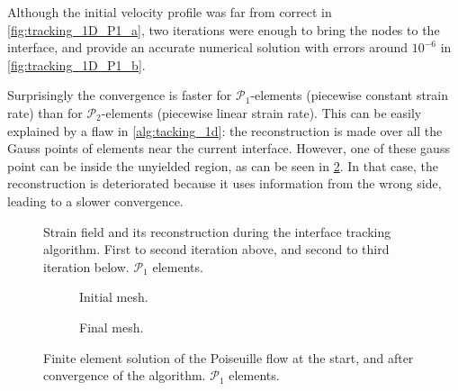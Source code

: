 \documentclass[11 pt]{report}
\begin{document}
\FloatBarrier
Although the initial velocity profile was far from correct in \cref{fig:tracking_1D_P1_a}, two iterations were enough to bring the nodes to the interface, and provide an accurate numerical solution with errors around $10^{-6}$ in \cref{fig:tracking_1D_P1_b}.

Surprisingly the convergence is faster for $\mathcal{P}_1$-elements (piecewise constant strain rate) than for $\mathcal{P}_2$-elements (piecewise linear strain rate). This can be easily explained by a flaw in \cref{alg:tacking_1d}: the reconstruction is made over all the Gauss points of elements near the current interface. However, one of these gauss point can be inside the unyielded region, as can be seen in \cref{fig:tracking_1D_P2_steps}. In that case, the reconstruction is deteriorated because it uses information from the wrong side, leading to a slower convergence.

\begin{figure}[hb]
    \centering
    \begin{subfigure}[t]{\textwidth}
        
        \label{subfig:tracking_1D_P2_step_1}
    \end{subfigure}
    \begin{subfigure}[t]{\textwidth}
        
    \end{subfigure}
    \caption{Strain field and its reconstruction during the interface tracking algorithm. First to second iteration above, and second to third iteration below. $\mathcal{P}_1$ elements.}
    \label{fig:tracking_1D_P2_steps}
\end{figure}

\begin{figure}[ht]
    \centering
    \begin{subfigure}[t]{\textwidth}
        
        \caption{Initial mesh.}
    \end{subfigure}
    \begin{subfigure}[t]{\textwidth}
        
        \caption{Final mesh.}
    \end{subfigure}
    \caption{Finite element solution of the Poiseuille flow at the start, and after convergence of the algorithm. $\mathcal{P}_1$ elements.}
    \label{fig:tracking_1D_P2}
\end{figure}
\end{document}

